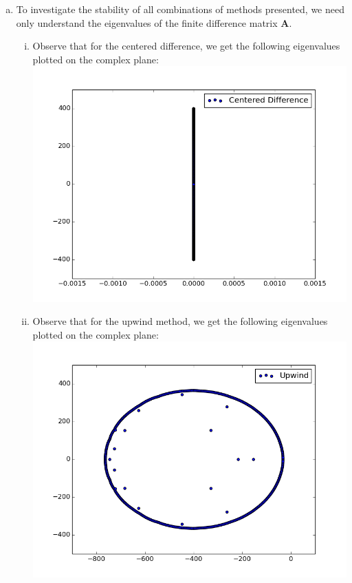 \documentclass[a4paper, 12pt]{article}
\begin{document}
\begin{enumerate}[(a)]
	\item To investigate the stability of all combinations of methods presented, we need only understand the eigenvalues of the finite difference matrix $\mathbf{A}$. 
	\begin{enumerate}[(i)]
		\item Observe that for the centered difference, we get the following eigenvalues plotted on the complex plane: \\
		\includegraphics[scale=.5]{fig5_1.png}\hfill \\
		\item Observe that for the upwind method, we get the following eigenvalues plotted on the complex plane: \\
		\includegraphics[scale=.5]{fig5_2.png}\hfill \\

\end{enumerate}
\end{enumerate}
\end{document}
